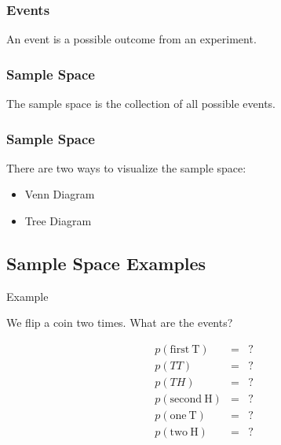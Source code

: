 \begin{frame}
  \frametitle{Events}

  \begin{definition}
    An event is a possible outcome from an experiment.
  \end{definition}

\end{frame}


\begin{frame}
  \frametitle{Sample Space}

  \begin{definition}
    The sample space is the collection of all possible events.
  \end{definition}

\end{frame}


\begin{frame}
  \frametitle{Sample Space}

  There are two ways to visualize the sample space:
  \begin{itemize}
  \item Venn Diagram
  \item Tree Diagram
  \end{itemize}

\end{frame}

\subsection{Sample Space Examples}

\begin{frame}{Example}

  We flip a coin two times. What are the events?

  {

    \begin{eqnarray*}
      p(\mathrm{first~T}) & = & ? \\
      p(TT) & = & ? \\
      p(TH) & = & ? \\
      p(\mathrm{second~H}) & = & ? \\
      p(\mathrm{one~T}) & = & ? \\
      p(\mathrm{two~H}) & = & ?
    \end{eqnarray*}

  }
  
\end{frame}

